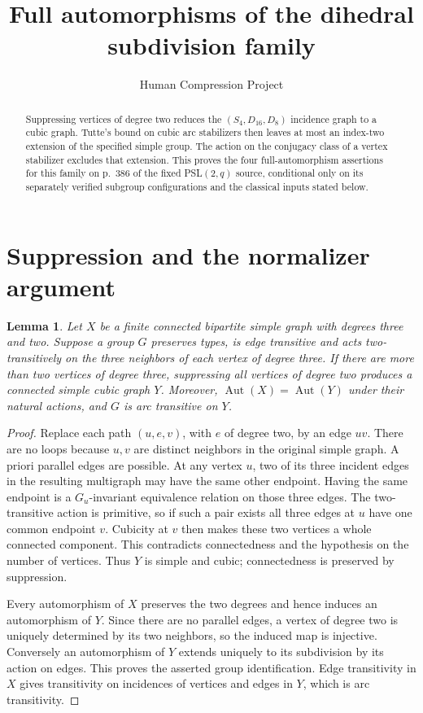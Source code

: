 \documentclass[11pt]{article}
\title{Full automorphisms of the dihedral subdivision family}
\author{Human Compression Project}\date{}
\newtheorem{lemma}{Lemma}
\newcommand{\Aut}{\operatorname{Aut}}
\begin{document}
\maketitle
\begin{abstract}
Suppressing vertices of degree two reduces the
$(S_4,D_{16},D_8)$ incidence graph to a cubic graph. Tutte's bound on
cubic arc stabilizers then leaves at most an index-two extension of
the specified simple group. The action on the conjugacy class of a
vertex stabilizer excludes that extension. This proves the four
full-automorphism assertions for this family on p.~386 of the fixed
PSL$(2,q)$ source, conditional only on its separately verified subgroup
configurations and the classical inputs stated below.
\end{abstract}

\section{Suppression and the normalizer argument}
\begin{lemma}\label{suppress}
Let $X$ be a finite connected bipartite simple graph with degrees three
and two. Suppose a group $G$ preserves types, is edge transitive and
acts two-transitively on the three neighbors of each vertex of degree
three. If there are more than two vertices of degree three, suppressing
all vertices of degree two produces a connected simple cubic graph $Y$.
Moreover, $\Aut(X)=\Aut(Y)$ under their natural actions, and $G$ is
arc transitive on $Y$.
\end{lemma}
\begin{proof}
Replace each path $(u,e,v)$, with $e$ of degree two, by an edge $uv$.
There are no loops because $u,v$ are distinct neighbors in the original
simple graph. A priori parallel edges are possible. At any vertex $u$,
two of its three incident edges in the resulting multigraph may have
the same other endpoint. Having the same endpoint is a
$G_u$-invariant equivalence relation on those three edges. The
two-transitive action is primitive, so if such a pair exists all three
edges at $u$ have one common endpoint $v$. Cubicity at $v$ then makes
these two vertices a whole connected component. This contradicts
connectedness and the hypothesis on the number of vertices. Thus $Y$
is simple and cubic; connectedness is preserved by suppression.

Every automorphism of $X$ preserves the two degrees and hence induces
an automorphism of $Y$. Since there are no parallel edges, a vertex of
degree two is uniquely determined by its two neighbors, so the induced
map is injective. Conversely an automorphism of $Y$ extends uniquely
to its subdivision by its action on edges. This proves the asserted
group identification. Edge transitivity in $X$ gives transitivity on
incidences of vertices and edges in $Y$, which is arc transitivity.
\end{proof}
\end{document}
